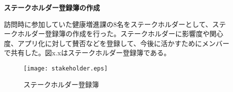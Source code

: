 ﻿\begin{description}
 \item[]
  \textbf{ステークホルダー登録簿の作成}\par
 訪問時に参加していた健康増進課の8名をステークホルダーとして、ステークホルダー登録簿の作成を行った。ステークホルダーに影響度や関心度、アプリ化に対して賛否などを登録して、今後に活かすためにメンバーで共有した。図x.xはステークホルダー登録簿である。

\begin{figure}[h]
\centering
\texttt{[image: stakeholder.eps]}
\caption{ステークホルダー登録簿}
\label{fig:one}
\end{figure}
\par

  \par
\end{description}
